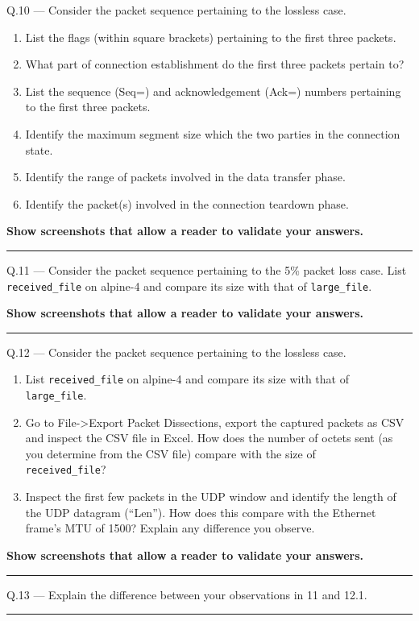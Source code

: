 \documentclass{article}
\newcommand\Que[2]{%
   \begin{samepage}
   \leavevmode\par
   \noindent
   Q.#1 --- #2\par\vspace{10pt}\hrule\vspace{10pt}
   \end{samepage}}
\begin{document}
\Que{10}{
Consider the packet sequence pertaining to the lossless case.
\begin{enumerate}
\item List the flags (within square brackets) pertaining to the
   first three packets.
\item What part of connection establishment do the first three
   packets pertain to?
\item List the sequence (Seq=) and acknowledgement (Ack=)
   numbers pertaining to the first three packets.
\item Identify the maximum segment size which the two parties in
   the connection state.
\item Identify the range of packets involved in the data
   transfer phase.
\item Identify the packet(s) involved in the connection teardown
   phase.
\end{enumerate}

\textbf{Show screenshots that allow a reader to validate your answers.}}


\Que{11}{
Consider the packet sequence pertaining to the 5\% packet loss
case. List \texttt{received\_file} on alpine-4 and compare its
size with that of \texttt{large\_file}.

\textbf{Show screenshots that allow a reader to validate your
answers.}}

\Que{12}{
Consider the packet sequence pertaining to the lossless case.
\begin{enumerate}
\item List \texttt{received\_file} on alpine-4 and compare its
   size with that of \\ \texttt{large\_file}.
\item Go to File->Export Packet Dissections, export the captured
   packets as CSV and inspect the CSV file in Excel. How does
   the number of octets sent (as you determine from the CSV
   file) compare with the size of\\ \texttt{received\_file}?
\item Inspect the first few packets in the UDP window and
   identify the length of the UDP datagram (``Len''). How does
   this compare with the Ethernet frame's MTU of 1500? Explain
   any difference you observe.
\end{enumerate}

\textbf{Show screenshots that allow a reader to validate your answers.}}

\Que{13}{Explain the difference between your observations in 11
and 12.1.}
\end{document}
